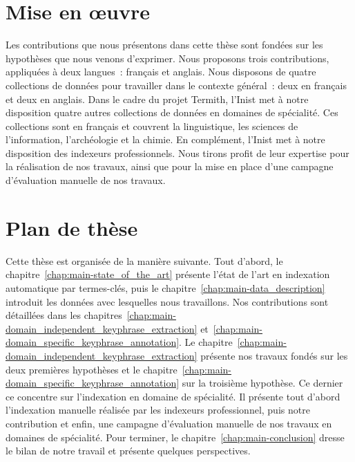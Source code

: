 
  \section{Mise en \oe{}uvre}
  \label{sec:main-introduction-realisation}
  Les contributions que nous présentons dans cette thèse sont fondées sur les
  hypothèses que nous venons d'exprimer. Nous proposons trois contributions,
  appliquées à deux langues~: français et anglais. Nous disposons de quatre
  collections de données pour travailler dans le contexte général~: deux en
  français et deux en anglais. Dans le cadre du projet Termith, l'Inist met à
  notre disposition quatre autres collections de données en domaines de
  spécialité. Ces collections sont en français et couvrent la linguistique, les
  sciences de l'information, l'archéologie et la chimie. En complément, l'Inist
  met à notre disposition des indexeurs professionnels. Nous tirons profit de
  leur expertise pour la réalisation de nos travaux, ainsi que pour la mise en
  place d'une campagne d'évaluation manuelle de nos travaux.


  \section{Plan de thèse}
  \label{sec:main-introduction-outline}
    Cette thèse est organisée de la manière suivante. Tout d'abord, le
    chapitre~\ref{chap:main-state_of_the_art} présente l'état de l'art en
    indexation automatique par termes-clés, puis le
    chapitre~\ref{chap:main-data_description} introduit les données avec
    lesquelles nous travaillons. Nos contributions sont détaillées dans les
    chapitres~\ref{chap:main-domain_independent_keyphrase_extraction}
    et~\ref{chap:main-domain_specific_keyphrase_annotation}. Le
    chapitre~\ref{chap:main-domain_independent_keyphrase_extraction} présente
    nos travaux fondés sur les deux premières hypothèses et le
    chapitre~\ref{chap:main-domain_specific_keyphrase_annotation} sur la
    troisième hypothèse. Ce dernier ce concentre sur l'indexation en domaine de
    spécialité. Il présente tout d'abord l'indexation manuelle réalisée par les
    indexeurs professionnel, puis notre contribution et enfin, une campagne
    d'évaluation manuelle de nos travaux en domaines de spécialité. Pour
    terminer, le chapitre~\ref{chap:main-conclusion} dresse le bilan de notre
    travail et présente quelques perspectives.

